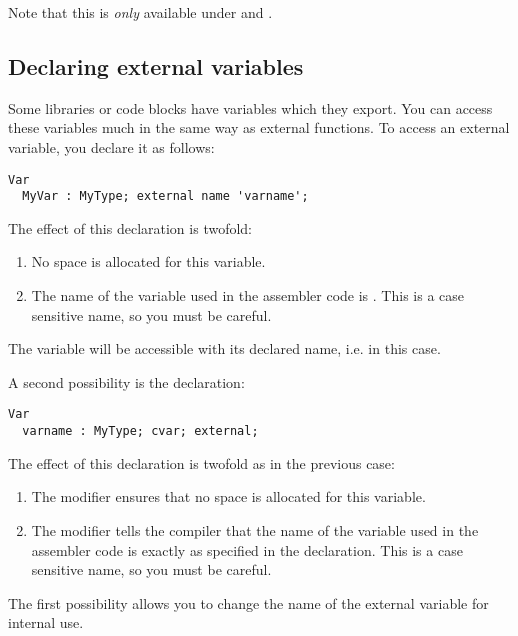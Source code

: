 \begin{enumerate}
\begin{remark}Note that this is {\em only} available under \windows and \ostwo.
\end{remark}
\end{enumerate}

\subsection{Declaring external variables}
\label{se:ExternalVars}

Some libraries or code blocks have variables which they export. You can access
these variables much in the same way as external functions. To access an
external variable, you declare it as follows:

\begin{verbatim}
Var
  MyVar : MyType; external name 'varname';
\end{verbatim}
The effect of this declaration is twofold:
\begin{enumerate}
\item No space is allocated for this variable.
\item The name of the variable used in the assembler code is .
This is a case sensitive name, so you must be careful.
\end{enumerate}
The variable will be
accessible with its declared name, i.e.  in this case.

A second possibility is the declaration:
\begin{verbatim}
Var
  varname : MyType; cvar; external;
\end{verbatim}
The effect of this declaration is twofold as in the previous case:
\begin{enumerate}
\item The  modifier ensures that no space is allocated for
this variable.
\item The  modifier tells the compiler that the name of the
variable used in the assembler code is exactly as specified in the
declaration. This is a case sensitive name, so you must be careful.
\end{enumerate}
The first possibility allows you to change the name of the
external variable for  internal use.

